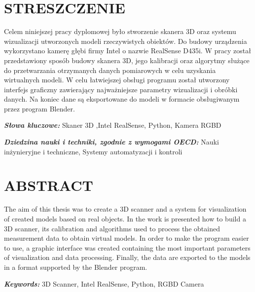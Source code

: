 \documentclass{pginz}
\providecommand{\keywordspl}[1]
{
  \small	
  \textbf{\textit{Słowa kluczowe:}} #1
}
\providecommand{\keywordseng}[1]
{
  \small	
  \textbf{\textit{Keywords:}} #1 
}
\providecommand{\dnauki}[1]
{
  \small	
  \textbf{\textit{Dziedzina nauki i techniki, zgodnie z wymogami OECD:}} #1
}
\begin{document}




\setcounter{page}{3}

 
\section*{STRESZCZENIE}
Celem niniejszej pracy dyplomowej było stworzenie skanera 3D oraz systemu wizualizacji utworzonych modeli rzeczywistych obiektów. Do budowy urządzenia wykorzystano kamerę głębi firmy Intel o nazwie RealSense D435i. W pracy został przedstawiony sposób budowy skanera 3D, jego kalibracji oraz algorytmy służące do przetwarzania otrzymanych danych pomiarowych w celu uzyskania wirtualnych modeli. W celu łatwiejszej obsługi programu został utworzony interfejs graficzny zawierający najważniejsze parametry wizualizacji i obróbki danych. Na koniec dane są eksportowane do modeli w formacie obsługiwanym przez program Blender.

\keywordspl{Skaner 3D ,Intel RealSense, Python, Kamera RGBD}

\dnauki{Nauki inżynieryjne i techniczne, Systemy automatyzacji i kontroli }

\section*{ABSTRACT}
The aim of this thesis was to create a 3D scanner and a system for visualization of created models based on real objects. In the work is presented how to build a 3D scanner, its calibration and algorithms used to process the obtained measurement data to obtain virtual models. In order to make the program easier to use, a graphic interface was created containing the most important parameters of visualization and data processing. Finally, the data are exported to the models in a format supported by the Blender program.

\keywordseng{3D Scanner, Intel RealSense, Python, RGBD Camera}
\newpage
\tableofcontents


\newpage









\renewcommand{\listtablename}{Spis tabel}
\renewcommand{\listfigurename}{Spis rysunków}
\listoffigures
\listoftables




\end{document}
